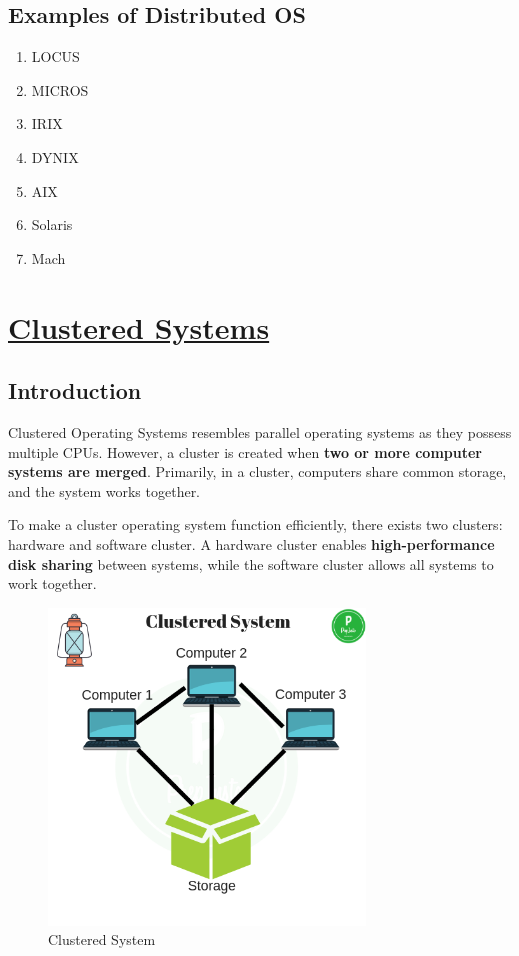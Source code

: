 \documentclass{article}
\begin{document}
\subsection{Examples of Distributed OS}
\begin{enumerate}
    \item LOCUS
    \item MICROS
    \item IRIX
    \item DYNIX
    \item AIX
    \item Solaris
    \item Mach
\end{enumerate}
\section{\underline{Clustered Systems}}
\subsection{Introduction}
Clustered Operating Systems resembles parallel operating systems as they possess multiple CPUs. However, a cluster is created when \textbf{two or more computer systems are merged}. Primarily, in a cluster, computers share common storage, and the system works together.

To make a cluster operating system function efficiently, there exists two clusters: hardware and software cluster. A hardware cluster enables \textbf{high-performance disk sharing} between systems, while the software cluster allows all systems to work together.
\begin{figure}[H]
    \centering
    \includegraphics[width=0.75\textwidth]{Clustered.png}
    \caption{Clustered System}
    \label{fig:ClusteredSystem}
\end{figure}
\end{document}
